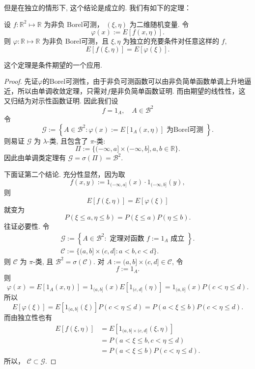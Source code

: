 但是在独立的情形下, 这个结论是成立的. 我们有如下的定理：
\begin{theorem}\label{thm:independence_of_random_variables_and_expectation}
    设 $f: \mathbb{R}^2 \mapsto \mathbb{R}$ 为非负 Borel可测， $(\xi, \eta)$ 为二维随机变量. 令
    $$
        \varphi(x):=E[f(x, \eta)] .
    $$
    则 $\varphi: \mathbb{R} \mapsto \mathbb{R}$ 为非负 Borel可测，且 $\xi, \eta$ 为独立的充要条件对任意这样的 $f$,
    $$
        E[f(\xi, \eta)]=E[\varphi(\xi)] .
    $$
\end{theorem}
\begin{note}
    这个定理是条件期望的一个应用.
\end{note}
\begin{proof}
    先证$\varphi$的Borel可测性，由于非负可测函数可以由非负简单函数单调上升地逼近，所以由单调收敛定理，只需对$f$是非负简单函数证明. 而由期望的线性性，这又归结为对示性函数证明. 因此我们设
    \[f=1_A,\quad A\in\mathscr{B}^2\]
    令
    $$
        \mathscr{G}:=\left\{A \in \mathscr{B}^2: \varphi(x):=E\left[1_A(x, \eta)\right] \text { 为Borel可测 }\right\} .
    $$
    则易证 $\mathscr{G}$ 为 $\lambda$-类, 且包含了 $\pi$-类:
    $$
        \Pi:=\{(-\infty, a] \times(-\infty, b], a, b \in \mathbb{R}\} .
    $$
    因此由单调类定理有 $\mathscr{G}=\sigma(\Pi)=\mathscr{B}^2$.

    下面证第二个结论. 充分性显然，因为取
    $$
        f(x, y):=1_{(-\infty, a]}(x) \cdot 1_{(-\infty, b]}(y),
    $$
    则
    $$
        E[f(\xi, \eta)]=E[\varphi(\xi)]
    $$
    就变为
    $$
        P(\xi \leqslant a, \eta \leqslant b)=P(\xi \leqslant a) P(\eta \leqslant b) .
    $$
    往证必要性. 令
    $$
        \begin{gathered}
            \mathscr{G}:=\left\{A \in \mathscr{B}^2: \text { 定理对函数 } f:=1_A \text { 成立 }\right\} . \\
            \mathscr{C}:=\{(a, b] \times(c, d]: a<b, c<d\} .
        \end{gathered}
    $$
    则 $\mathscr{C}$ 为 $\pi$-类, 且 $\mathscr{B}^2=\sigma(\mathscr{C})$. 对 $A:=(a, b] \times(c, d] \in \mathscr{C}$, 令
    $$
        f:=1_A .
    $$
    则
    $$
        \varphi(x)=E\left[1_A(x, \eta)\right]=1_{(a, b]}(x) E\left[1_{(c, d]}(\eta)\right]=1_{(a, b]}(x) P(c<\eta \leqslant d) .
    $$
    所以
    $$
        E[\varphi(\xi)]=E\left[1_{(a, b]}(\xi)\right] P(c<\eta \leqslant d)=P(a<\xi \leqslant b) P(c<\eta \leqslant d) .
    $$
    而由独立性也有
    $$
        \begin{aligned}
            E[f(\xi, \eta)] & =E\left[1_{(a, b] \times(c, d]}(\xi, \eta)\right] \\
                            & =P(a<\xi \leqslant b, c<\eta \leqslant d)         \\
                            & =P(a<\xi \leqslant b) P(c<\eta \leqslant d) .
        \end{aligned}
    $$
    所以， $\mathscr{C} \subset \mathscr{G}$.


\end{proof}
